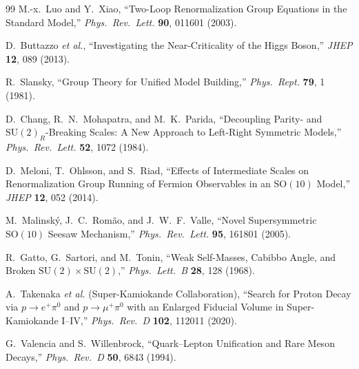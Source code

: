 \documentclass[11pt,a4paper]{article}
\begin{document}
\begin{thebibliography}{99}
M.-x.~Luo and Y.~Xiao, ``Two-Loop Renormalization Group Equations in the Standard Model,'' \emph{Phys.\ Rev.\ Lett.} \textbf{90}, 011601 (2003).

D.~Buttazzo \textit{et al.}, ``Investigating the Near-Criticality of the Higgs Boson,'' \emph{JHEP} \textbf{12}, 089 (2013).

R.~Slansky, ``Group Theory for Unified Model Building,'' \emph{Phys.\ Rept.} \textbf{79}, 1 (1981).

D.~Chang, R.~N.~Mohapatra, and M.~K.~Parida, ``Decoupling Parity- and $\mathrm{SU}(2)_R$-Breaking Scales: A New Approach to Left-Right Symmetric Models,'' \emph{Phys.\ Rev.\ Lett.} \textbf{52}, 1072 (1984).

D.~Meloni, T.~Ohlsson, and S.~Riad, ``Effects of Intermediate Scales on Renormalization Group Running of Fermion Observables in an $\mathrm{SO}(10)$ Model,'' \emph{JHEP} \textbf{12}, 052 (2014).

M.~Malinsk\'y, J.~C.~Rom\~ao, and J.~W.~F.~Valle, ``Novel Supersymmetric $\mathrm{SO}(10)$ Seesaw Mechanism,'' \emph{Phys.\ Rev.\ Lett.} \textbf{95}, 161801 (2005).

R.~Gatto, G.~Sartori, and M.~Tonin, ``Weak Self-Masses, Cabibbo Angle, and Broken $\mathrm{SU}(2)\times\mathrm{SU}(2)$,'' \emph{Phys.\ Lett.\ B} \textbf{28}, 128 (1968).

A.~Takenaka \textit{et al.} (Super-Kamiokande Collaboration), ``Search for Proton Decay via $p \to e^+\pi^0$ and $p \to \mu^+\pi^0$ with an Enlarged Fiducial Volume in Super-Kamiokande I--IV,'' \emph{Phys.\ Rev.\ D} \textbf{102}, 112011 (2020).

G.~Valencia and S.~Willenbrock, ``Quark--Lepton Unification and Rare Meson Decays,'' \emph{Phys.\ Rev.\ D} \textbf{50}, 6843 (1994).

\end{thebibliography}
\end{document}
